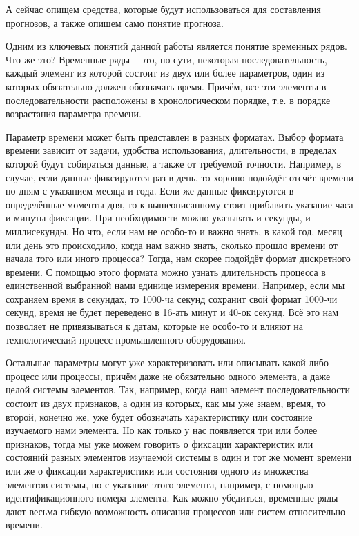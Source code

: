 {\gostFont

  \par \redline А сейчас опищем средства, которые будут использоваться для составления прогнозов, а также опишем само понятие прогноза.

  \par \redline Одним из ключевых понятий данной работы является понятие временных рядов. Что же это? Временные ряды {--} это, по сути, некоторая последовательность, каждый элемент из которой состоит из двух или более параметров, один из которых обязательно должен обозначать время. Причём, все эти элементы в последовательности расположены в хронологическом порядке, т.е. в порядке возрастания параметра времени. 

  \par \redline Параметр времени может быть представлен в разных форматах. Выбор формата времени зависит от задачи, удобства использования, длительности, в пределах которой будут собираться данные, а также от требуемой точности. Например, в случае, если данные фиксируются раз в день, то хорошо подойдёт отсчёт времени по дням с указанием месяца и года. Если же данные фиксируются в определённые моменты дня, то к вышеописанному стоит прибавить указание часа и минуты фиксации. При необходимости можно указывать и секунды, и миллисекунды. Но что, если нам не особо-то и важно знать, в какой год, месяц или день это происходило, когда нам важно знать, сколько прошло времени от начала того или иного процесса? Тогда, нам скорее подойдёт формат дискретного времени. С помощью этого формата можно узнать длительность процесса в единственной выбранной нами единице измерения времени. Например, если мы сохраняем время в секундах, то 1000-ча секунд сохранит свой формат 1000-чи секунд, время не будет переведено в 16-ать минут и 40-ок секунд. Всё это нам позволяет не привязываться к датам, которые не особо-то и влияют на технологический процесс промышленного оборудования.

  \par \redline Остальные параметры могут уже характеризовать или описывать какой-либо процесс или процессы, причём даже не обязательно одного элемента, а даже целой системы элементов. Так, например, когда наш элемент последовательности состоит из двух признаков, а один из которых, как мы уже знаем, время, то второй, конечно же, уже будет обозначать характеристику или состояние изучаемого нами элемента. Но как только у нас появляется три или более признаков, тогда мы уже можем говорить о фиксации характеристик или состояний разных элементов изучаемой системы в один и тот же момент времени или же о фиксации характеристики или состояния одного из множества элементов системы, но с указание этого элемента, например, с помощью идентификационного номера элемента. Как можно убедиться, временные ряды дают весьма гибкую возможность описания процессов или систем относительно времени. 

}

